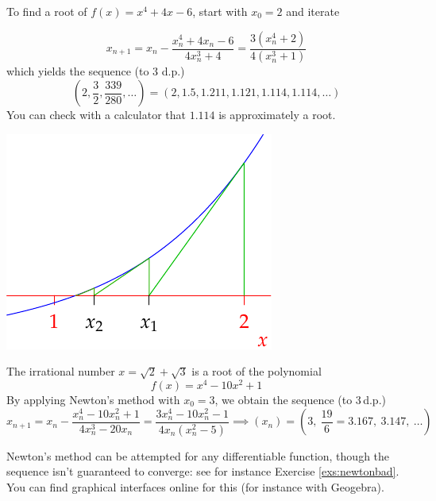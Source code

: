 	

\begin{examples}{}{}
	\exstart To find a root of $f(x)=x^4+4x-6$, start with $x_0=2$ and iterate
	\begin{enumerate}\setcounter{enumi}{1}
		\begin{minipage}[t]{0.62\linewidth}\vspace{-10pt}
			\item[]
			\[
				x_{n+1}=x_n-\frac{x_n^4+4x_n-6}{4x_n^3+4} =\frac{3(x_n^4+2)}{4(x_n^3+1)}
			\]
			which yields the sequence (to 3 d.p.)
			\[
				\left(2,\frac 32,\frac{339}{280},\ldots\right)=(2,1.5,1.211,1.121,1.114,1.114,\ldots)
			\]
			You can check with a calculator that $1.114$ is approximately a root.
		\end{minipage}
		\hfill
		\begin{minipage}[t]{0.37\linewidth}\vspace{-8pt}
			\flushright\includegraphics[scale=0.95]{newton-raphson2}
		\end{minipage}
	
		\item The irrational number $x=\sqrt 2+\sqrt 3$ is a root of the polynomial
		\[
			f(x)=x^4-10x^2+1
		\]
		By applying Newton's method with $x_0=3$, we obtain the sequence (to 3\,d.p.)
		\[
			x_{n+1}=x_n-\frac{x_n^4-10x_n^2+1}{4x_n^3-20x_n} =\frac{3x_n^4-10x_n^2-1}{4x_n(x_n^2-5)} \implies (x_n)=\left(3,\ \frac{19}6=3.167,\ %
			3.147,\ \ldots \right)
		\]
	\end{enumerate}
\end{examples}

\goodbreak

Newton's method can be attempted for any differentiable function, though the sequence isn't guaranteed to converge: see for instance Exercise \ref{exs:newtonbad}. You can find graphical interfaces online for this (for instance with Geogebra).



